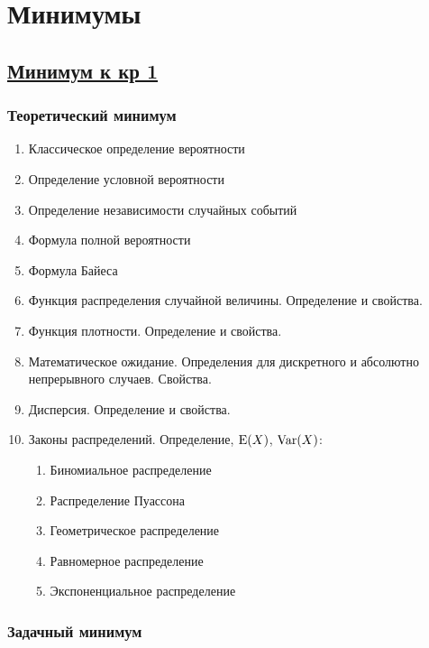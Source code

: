 \section{Минимумы}



\subsection[Минимум к кр 1]{\hyperref[sec:sol_minimum_kr_01]{Минимум к кр 1}}
\label{sec:minimum_kr_01}

\subsubsection*{Теоретический минимум}


\begin{enumerate}
	\item Классическое определение вероятности
	\item Определение условной вероятности
	\item Определение независимости случайных событий
	\item Формула полной вероятности
	\item Формула Байеса
	\item Функция распределения случайной величины. Определение и свойства.
	\item Функция плотности. Определение и свойства.
	\item Математическое ожидание. Определения для дискретного и абсолютно непрерывного случаев. Свойства.
	\item Дисперсия. Определение и свойства.
	\item Законы распределений. Определение, $\operatorname{E}(X)$, $\operatorname{Var}(X)$:
	\begin{enumerate}
	\item Биномиальное распределение
	\item Распределение Пуассона
	\item Геометрическое распределение
	\item Равномерное распределение
	\item Экспоненциальное распределение
	\end{enumerate}
\end{enumerate}


\subsubsection*{Задачный минимум}

